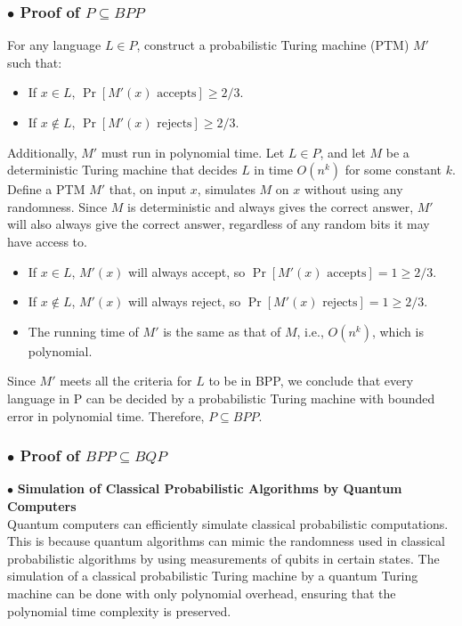 \documentclass[a4paper]{article}
\begin{document}
\subsubsection{$\bullet$ Proof of $P \subseteq BPP$}
For any language \( L \in P \), construct a probabilistic Turing machine (PTM) \( M' \) such that:
\begin{itemize}
    \item If \( x \in L \), \( \Pr[M'(x) \text{ accepts}] \geq 2/3 \).
    \item If \( x \notin L \), \( \Pr[M'(x) \text{ rejects}] \geq 2/3 \).
\end{itemize}
Additionally, \( M' \) must run in polynomial time.
Let \( L \in P \), and let \( M \) be a deterministic Turing machine that decides \( L \) in time \( O(n^k) \) for some constant \( k \).
Define a PTM \( M' \) that, on input \( x \), simulates \( M \) on \( x \) without using any randomness.
Since \( M \) is deterministic and always gives the correct answer, \( M' \) will also always give the correct answer, regardless of any random bits it may have access to.
\begin{itemize}
    \item If \( x \in L \), \( M'(x) \) will always accept, so \( \Pr[M'(x) \text{ accepts}] = 1 \geq 2/3 \).
    \item If \( x \notin L \), \( M'(x) \) will always reject, so \( \Pr[M'(x) \text{ rejects}] = 1 \geq 2/3 \).
    \item The running time of \( M' \) is the same as that of \( M \), i.e., \( O(n^k) \), which is polynomial.
\end{itemize}
Since \( M' \) meets all the criteria for \( L \) to be in BPP, we conclude that every language in P can be decided by a probabilistic Turing machine with bounded error in polynomial time.
Therefore, \( P \subseteq BPP \).

\subsubsection{$\bullet$ Proof of $BPP \subseteq BQP$}
\noindent $\bullet$ \textbf{Simulation of Classical Probabilistic Algorithms by Quantum Computers}\\
Quantum computers can efficiently simulate classical probabilistic computations. This is because quantum algorithms can mimic the randomness used in classical probabilistic algorithms by using measurements of qubits in certain states. The simulation of a classical probabilistic Turing machine by a quantum Turing machine can be done with only polynomial overhead, ensuring that the polynomial time complexity is preserved.
\end{document}
